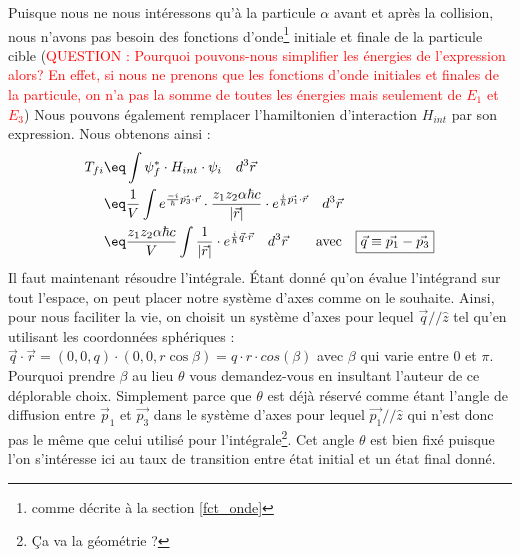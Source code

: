 Puisque nous ne nous intéressons qu'à la particule $\alpha$ avant et après la collision, nous n'avons pas besoin des fonctions d'onde\footnote{comme décrite à la section \ref{fct_onde}} initiale et finale de la particule cible (\textcolor{red}{QUESTION : Pourquoi pouvons-nous simplifier les énergies de l'expression alors? En effet, si nous ne prenons que les fonctions d'onde initiales et finales de la particule, on n'a pas la somme de toutes les énergies mais seulement de $E_1$ et $E_3$})
Nous pouvons également remplacer l'hamiltonien d'interaction $H_{int}$ par son expression. Nous obtenons ainsi :
\begin{align*}
    T_{fi}
        &\eq
    \int \psi_f^* \cdot H_{int} \cdot \psi_i \quad d^3\vec{r}\\
        &\eq
    \dfrac{1}{V} 
    \int e^{\frac{-i}{\hbar}\vec{p_3}\cdot\vec{r}}    \cdot
    \dfrac{z_1 z_2\alpha\hbar c}{|\vec{r}|}                   \cdot
    e^{\frac{i}{\hbar}\vec{p_1}\cdot\vec{r}}
    \quad d^3\vec{r}
    \\
        &\eq
    \dfrac{z_1 z_2\alpha\hbar c}{V} 
    \int 
    \dfrac{1}{|\vec{r}|} \cdot e^{\frac{i}{\hbar}\vec{q}\cdot\vec{r}}
    \quad d^3\vec{r} 
    \qquad \text{avec} \quad \boxed{ \vec{q} \equiv \vec{p_1}-\vec{p_3}}
\end{align*}
Il faut maintenant résoudre l'intégrale. Étant donné qu'on évalue l'intégrand sur tout l'espace, on peut placer notre système d'axes comme on le souhaite. Ainsi, pour nous faciliter la vie, on choisit un système d'axes pour lequel $\vec{q} // \hat{z}$ tel qu'en utilisant les coordonnées sphériques : $\vec{q}\cdot\vec{r} = (0,0,q)\cdot(0,0,r\cos{\beta}) = q\cdot r \cdot cos(\beta)$ avec $\beta$ qui varie entre 0 et $\pi$. Pourquoi prendre $\beta$ au lieu $\theta$ vous demandez-vous en insultant l'auteur de ce déplorable choix. Simplement parce que $\theta$ est déjà réservé comme étant l'angle de diffusion entre $\vec{p}_1$ et $\vec{p_3}$ dans le système d'axes pour lequel $\vec{p_1} // \hat{z}$ qui n'est donc pas le même que celui utilisé pour l'intégrale\footnote{Ça va la géométrie ?}. Cet angle $\theta$ est bien fixé puisque l'on s'intéresse ici au taux de transition entre état initial et un état final donné.\\
